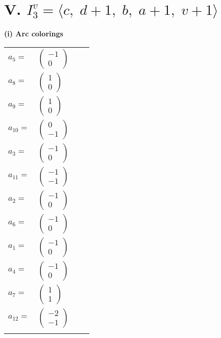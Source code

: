 \documentclass[1p]{elsarticle_modified}
\theoremstyle{definition}
\begin{document}
\centering \section*{V. $I^v_{3}= \langle c,\;d+1,\;b,\;a+1,\;v+1 \rangle$}
\flushleft \textbf{(i) Arc colorings}\\
\begin{tabular}{m{7pt} m{180pt} m{7pt} m{180pt} }
\flushright $a_{5}=$&$\begin{pmatrix}-1\\0\end{pmatrix}$ \\
\flushright $a_{8}=$&$\begin{pmatrix}1\\0\end{pmatrix}$ \\
\flushright $a_{9}=$&$\begin{pmatrix}1\\0\end{pmatrix}$ \\
\flushright $a_{10}=$&$\begin{pmatrix}0\\-1\end{pmatrix}$ \\
\flushright $a_{3}=$&$\begin{pmatrix}-1\\0\end{pmatrix}$ \\
\flushright $a_{11}=$&$\begin{pmatrix}-1\\-1\end{pmatrix}$ \\
\flushright $a_{2}=$&$\begin{pmatrix}-1\\0\end{pmatrix}$ \\
\flushright $a_{6}=$&$\begin{pmatrix}-1\\0\end{pmatrix}$ \\
\flushright $a_{1}=$&$\begin{pmatrix}-1\\0\end{pmatrix}$ \\
\flushright $a_{4}=$&$\begin{pmatrix}-1\\0\end{pmatrix}$ \\
\flushright $a_{7}=$&$\begin{pmatrix}1\\1\end{pmatrix}$ \\
\flushright $a_{12}=$&$\begin{pmatrix}-2\\-1\end{pmatrix}$\\&\end{tabular}
\end{document}
